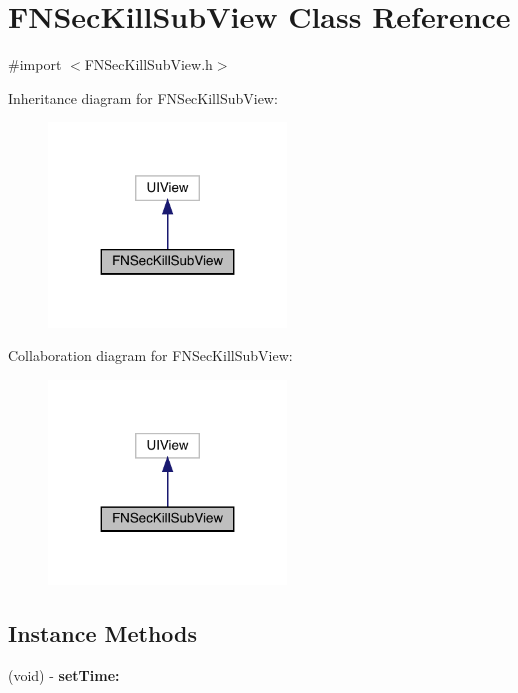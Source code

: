 \hypertarget{interface_f_n_sec_kill_sub_view}{}\section{F\+N\+Sec\+Kill\+Sub\+View Class Reference}
\label{interface_f_n_sec_kill_sub_view}


{\ttfamily \#import $<$F\+N\+Sec\+Kill\+Sub\+View.\+h$>$}



Inheritance diagram for F\+N\+Sec\+Kill\+Sub\+View\+:\nopagebreak
\begin{figure}[H]
\begin{center}
\leavevmode
\includegraphics[width=179pt]{interface_f_n_sec_kill_sub_view__inherit__graph}
\end{center}
\end{figure}


Collaboration diagram for F\+N\+Sec\+Kill\+Sub\+View\+:\nopagebreak
\begin{figure}[H]
\begin{center}
\leavevmode
\includegraphics[width=179pt]{interface_f_n_sec_kill_sub_view__coll__graph}
\end{center}
\end{figure}
\subsection*{Instance Methods}
\begin{DoxyCompactItemize}
\item 
\mbox{\label{interface_f_n_sec_kill_sub_view_aaa1dee843d8071afbb8fd59785a5f5e8}} 
(void) -\/ {\bfseries set\+Time\+:}
\end{DoxyCompactItemize}
